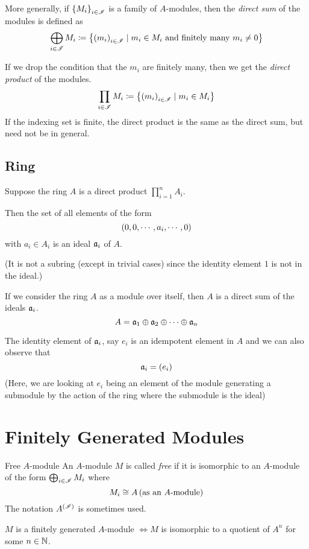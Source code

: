 More generally, if \(\left\{ M_i \right\}_{i \in {\mathscr{I}}}\) is a family of \(A\)-modules,
then the \emph{direct sum} of the modules is defined as
\[
	\bigoplus_{i \in {\mathscr{I}}} M_i \coloneqq \left\{ \left( m_i \right)_{i \in {\mathscr{I}}} \mid
	m_i \in M_i \text{ and finitely many } m_i \neq 0 \right\}
\]

If we drop the condition that the \(m_i\) are finitely many, then we get the
\emph{direct product} of the modules.
\[
	\prod_{i \in {\mathscr{I}}} M_i \coloneqq \left\{ \left( m_i \right)_{i \in {\mathscr{I}}} \mid
	m_i \in M_i \right\}
\]
If the indexing set is finite, the direct product is the same as the direct
sum, but need not be in general.

\subsection{Ring}
Suppose the ring \(A\) is a direct product \(\prod_{i=1}^n A_i\).

Then the set of all elements of the form
\[
	\left( 0, 0, \cdots, a_i, \cdots, 0 \right)
\]
with \(a_i \in A_i\) is an ideal \(\mathfrak{a}_i\) of \(A\).

(It is not a subring (except in trivial cases) since the identity element
\(1\) is not in the ideal.)

If we consider the ring \(A\) as a module over itself, then
\(A\) is a direct sum of the ideals \(\mathfrak{a}_i\).
\[
	A = \mathfrak{a}_1 \oplus \mathfrak{a}_2 \oplus \cdots \oplus \mathfrak{a}_n
\]

The identity element of \(\mathfrak{a}_i\), say \(e_i\) is an idempotent element
in \(A\) and we can also observe that
\[
	\mathfrak{a}_i = \left( e_i \right)
\]
(Here, we are looking at \(e_i\) being an element of the module generating
a submodule by the action of the ring where the submodule is the ideal)


\pagebreak
\section{Finitely Generated Modules}

\begin{defn}{Free \(A\)-module}{}
	An \(A\)-module \(M\) is called \emph{free} if it is isomorphic to
	an \(A\)-module of the form \(\bigoplus_{i \in {\mathscr{I}}} M_i\) where
	\[
		M_i \cong A \left( \text{as an } A\text{-module} \right)
	\]
	The notation \(A^{\left( {\mathscr{I}} \right)}\) is sometimes used.
\end{defn}


\begin{proposition}{}{}
	\(M\) is a finitely generated \(A\)-module \(\iff M\) is
	isomorphic to a quotient of \(A^n\) for some \(n \in \NN\).
\end{proposition}

